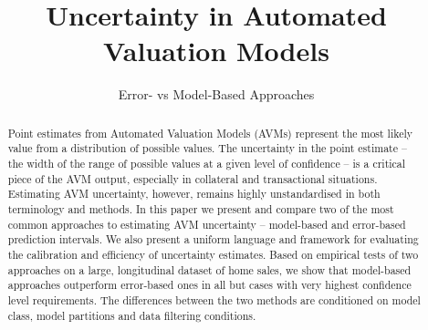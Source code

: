 \documentclass[colTwo]{anon}
\theoremstyle{definition}
\begin{document}

\title{Uncertainty in Automated Valuation Models}

\subtitle{Error- vs Model-Based Approaches} 
 	



\CCbY

\begin{abstracts}
\begin{abstract}
Point estimates from Automated Valuation Models (AVMs) represent the most likely value from a distribution of possible values. The uncertainty in the point estimate -- the width of the range of possible values at a given level of confidence -- is a critical piece of the AVM output, especially in collateral and transactional situations. Estimating AVM uncertainty, however, remains highly unstandardised in both terminology and methods. In this paper we present and compare two of the most common approaches to estimating AVM uncertainty -- model-based and error-based prediction intervals. We also present a uniform language and framework for evaluating the calibration and efficiency of uncertainty estimates. Based on empirical tests of two approaches on a large, longitudinal dataset of home sales, we show that model-based approaches outperform error-based ones in all but cases with very highest confidence level requirements. The differences between the two methods are conditioned on model class, model partitions and data filtering conditions. 

\end{abstract}

\end{abstracts}

\maketitle
\end{document}
